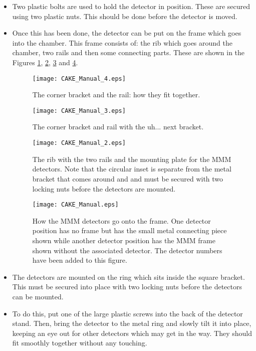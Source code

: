 \documentclass[11pt]{report}
\begin{document}
\begin{itemize}
\item Two plastic bolts are used to hold the detector in position. These are secured using two plastic nuts. This should be done before the detector is moved.

\item Once this has been done, the detector can be put on the frame which goes into the chamber. This frame consists of: the rib which goes around the chamber, two rails and then some connecting parts. These are shown in the Figures \ref{fig:CAKE_bracket_1}, \ref{fig:CAKE_bracket_2}, \ref{fig:CAKE_bracket_3} and \ref{fig:CAKE_whole_frame}.

\begin{figure}
 \texttt{[image: CAKE\_Manual\_4.eps]}
 \caption{The corner bracket and the rail: how they fit together.}
 \label{fig:CAKE_bracket_1}
\end{figure}

\begin{figure}
 \texttt{[image: CAKE\_Manual\_3.eps]}
 \caption{The corner bracket and rail with the uh... next bracket.}
 \label{fig:CAKE_bracket_2}
\end{figure}

\begin{figure}
 \texttt{[image: CAKE\_Manual\_2.eps]}
 \caption{The rib with the two rails and the mounting plate for the MMM detectors. Note that the circular inset is separate from the metal bracket that comes around and and must be secured with two locking nuts before the detectors are mounted.}
 \label{fig:CAKE_bracket_3}
\end{figure}

\begin{figure}
 \texttt{[image: CAKE\_Manual.eps]}
 \caption{How the MMM detectors go onto the frame. One detector position has no frame but has the small metal connecting piece shown while another detector position has the MMM frame shown without the associated detector. The detector numbers have been added to this figure.}
 \label{fig:CAKE_whole_frame}
\end{figure}


\item The detectors are mounted on the ring which sits inside the square bracket. This must be secured into place with two locking nuts before the detectors can be mounted.

\item To do this, put one of the large plastic screws into the back of the detector stand. Then, bring the detector to the metal ring and slowly tilt it into place, keeping an eye out for other detectors which may get in the way. They should fit smoothly together without any touching.


\end{itemize}
\end{document}
